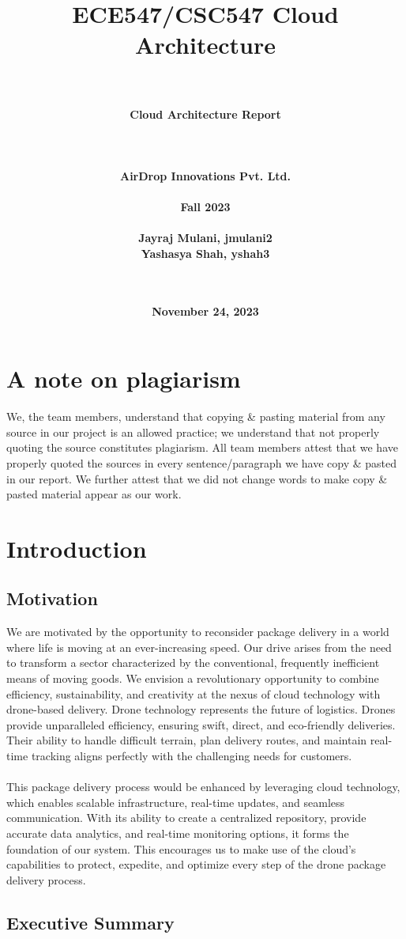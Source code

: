\documentclass{article}
\title{\textbf{ECE547/CSC547 Cloud Architecture}}
\author{
\\\\\textbf{Cloud Architecture Report} \\\\
\\\\\textbf{AirDrop Innovations Pvt. Ltd.} \\\\
\textbf{Fall 2023} \\\\
\textbf{Jayraj Mulani, jmulani2} \\
\textbf{Yashasya Shah, yshah3} \\\\\\
}
\date{\textbf{November 24, 2023}}
\begin{document}
\maketitle
\newpage
\tableofcontents
\newpage
\section*{A note on plagiarism}
We, the team members, understand that copying \& pasting material from any source in our project is an allowed practice; we understand that not properly quoting the source constitutes plagiarism.
All team members attest that we have properly quoted the sources in every sentence/paragraph we have copy \& pasted in our report. We further attest that we did not change words to make copy \& pasted material appear as our work.
\section{Introduction}
\subsection{Motivation}
We are motivated by the opportunity to reconsider package delivery in a world where life is moving at an ever-increasing speed. Our drive arises from the need to transform a sector characterized by the conventional, frequently inefficient means of moving goods. We envision a revolutionary opportunity to combine efficiency, sustainability, and creativity at the nexus of cloud technology with drone-based delivery. Drone technology represents the future of logistics. Drones provide unparalleled efficiency, ensuring swift, direct, and eco-friendly deliveries.  Their ability to handle difficult terrain, plan delivery routes, and maintain real-time tracking aligns perfectly with the challenging needs for customers. \\\\
This package delivery process would be enhanced by leveraging cloud technology, which enables scalable infrastructure, real-time updates, and seamless communication. With its ability to create a centralized repository, provide accurate data analytics, and real-time monitoring options, it forms the foundation of our system. This encourages us to make use of the cloud's capabilities to protect, expedite, and optimize every step of the drone package delivery process.

\subsection{Executive Summary}
\end{document}

